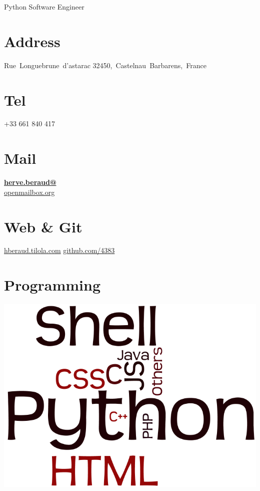 \documentclass[]{friggeri-cv}
\begin{document}
      {Python Software Engineer}
      

\begin{aside}
  \section{Address}
    Rue~Longuebrune~d'astarac
    32450,~Castelnau~Barbarens,~France
    ~
  \section{Tel}
    +33 661 840 417
    ~
  \section{Mail}
    \href{mailto:herve.beraud@openmailbox.org}{\textbf{herve.beraud@}\\openmailbox.org}
    ~
  \section{Web \& Git}
    \href{http://hberaud.tilola.com}{hberaud.tilola.com}
    \href{https://github.com/4383}{github.com/4383}
    ~
  \section{Programming}
    \includegraphics[scale=0.15]{img/programming.png}
    ~

\end{aside}
\end{document}
